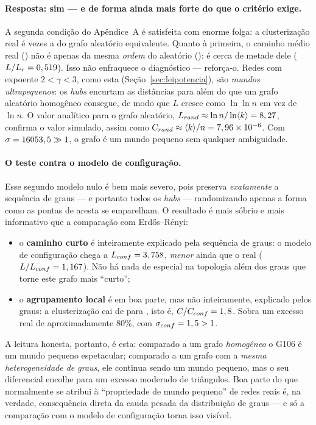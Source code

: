 \documentclass[sigconf]{webmedia}
\begin{document}
\paragraph{Resposta: sim --- e de forma ainda mais forte do que o
critério exige.} A segunda condição do Apêndice~A é satisfeita com enorme
folga: a clusterização real é \swRazaoCer{} vezes a do grafo aleatório
equivalente. Quanto à primeira, o caminho médio real (\swL{}) não é apenas
da mesma \emph{ordem} do aleatório (\swLer{}): é cerca de metade dele
($L/L_r = 0,519{}$). Isso não enfraquece o diagnóstico --- reforça-o.
Redes com expoente $2<\gamma<3$, como esta
(Seção~\ref{sec:leipotencia}), são \emph{mundos ultrapequenos}: os
\textit{hubs} encurtam as distâncias para além do que um grafo aleatório
homogêneo consegue, de modo que $L$ cresce como $\ln\ln n$ em vez de
$\ln n$. O valor analítico para o grafo aleatório,
$L_{rand}\approx\ln n/\ln\langle k\rangle = 8,27{}$, confirma o
valor simulado, assim como $C_{rand}\approx\langle k\rangle/n =
7,96 \times 10^{-6}{}$. Com $\sigma = 16053,5{} \gg 1$, o grafo é um mundo
pequeno sem qualquer ambiguidade.

\paragraph{O teste contra o modelo de configuração.} Esse segundo modelo
nulo é bem mais severo, pois preserva \emph{exatamente} a sequência de
graus --- e portanto todos os \textit{hubs} --- randomizando apenas a
forma como as pontas de aresta se emparelham. O resultado é mais sóbrio e
mais informativo que a comparação com Erdős--Rényi:

\begin{itemize}[nosep]
  \item o \textbf{caminho curto} é inteiramente explicado pela sequência
        de graus: o modelo de configuração chega a $L_{conf}=3,758{}$,
        \emph{menor} ainda que o real ($L/L_{conf} = 1,167{}$).
        Não há nada de especial na topologia além dos graus que torne este
        grafo mais ``curto'';
  \item o \textbf{agrupamento local} é em boa parte, mas não
        inteiramente, explicado pelos graus: a clusterização cai de
        \swC{} para \swCconf{}, isto é, $C/C_{conf} = 1,8{}$.
        Sobra um excesso real de aproximadamente 80\%, com
        $\sigma_{conf} = 1,5{} > 1$.
\end{itemize}

\noindent
A leitura honesta, portanto, é esta: comparado a um grafo \emph{homogêneo}
o G106 é um mundo pequeno espetacular; comparado a um grafo com a
\emph{mesma heterogeneidade de graus}, ele continua sendo um mundo
pequeno, mas o seu diferencial encolhe para um excesso moderado de
triângulos. Boa parte do que normalmente se atribui à ``propriedade de
mundo pequeno'' de redes reais é, na verdade, consequência direta da cauda
pesada da distribuição de graus --- e só a comparação com o modelo de
configuração torna isso visível.
\end{document}
